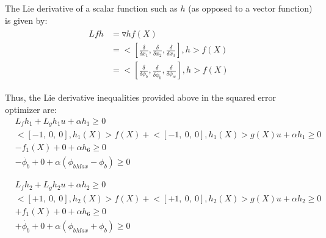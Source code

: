 \documentclass[journal, onecolumn]{IEEEtran} %
\begin{document}
The Lie derivative of a scalar function such as $h$ (as opposed to a vector function) is given by:
\begin{eqnarray}
    \begin{aligned}
        Lfh &= \triangledown h f(X) \\
            &= \Big<[\frac{\delta}{\delta x_1}, \frac{\delta}{\delta x_2}, \frac{\delta}{\delta x_3}],  h \Big> f(X) \\
            &= \Big<[\frac{\delta}{\delta \phi_b}, \frac{\delta}{\delta \dot{\phi_b}}, \frac{\delta}{\delta \phi_w}],  h \Big> f(X)
    \end{aligned}
\end{eqnarray}

Thus, the Lie derivative inequalities provided above in the squared error optimizer are:
\begin{equation}
    \begin{aligned}
        &L_fh_1 + L_g h_1 u + \alpha h_1 \geq 0 \\
        &\Big< [-1,\ 0,\ 0], h_1(X)\Big> f(X) + \Big< [-1,\ 0,\ 0], h_1(X)\Big> g(X)u + \alpha h_1 \geq 0 \\
        &-f_1(X) + 0 + \alpha h_6 \geq 0 \\
        &-\dot{\phi_b} + 0 + \alpha (\phi_{bMax} - \phi_b) \geq 0
    \end{aligned}
\end{equation}

\begin{equation}
    \begin{aligned}
        &L_fh_2 + L_g h_2 u + \alpha h_2 \geq 0 \\
        &\Big< [+1,\ 0,\ 0], h_2(X)\Big> f(X) + \Big< [+1,\ 0,\ 0], h_2(X)\Big> g(X)u + \alpha h_2 \geq 0 \\
        &+f_1(X) + 0 + \alpha h_6 \geq 0 \\
        &+\dot{\phi_b} + 0 + \alpha (\phi_{bMax} + \phi_b) \geq 0 \\
    \end{aligned}
\end{equation}
\end{document}
